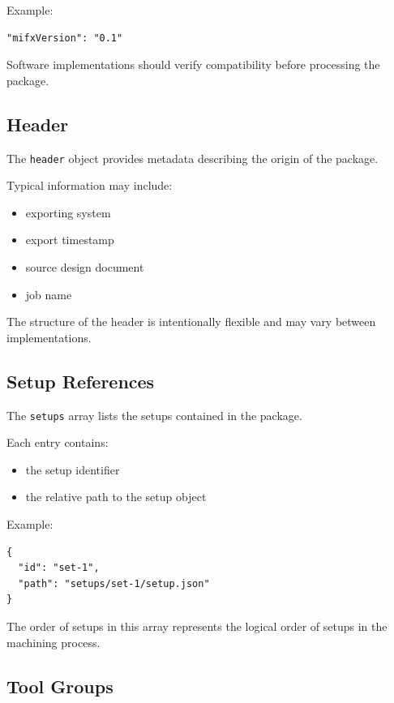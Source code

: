 Example:

\begin{verbatim}
"mifxVersion": "0.1"
\end{verbatim}

Software implementations should verify compatibility before processing the package.

\subsection{Header}

The \texttt{header} object provides metadata describing the origin of the package.

Typical information may include:

\begin{itemize}
\item exporting system
\item export timestamp
\item source design document
\item job name
\end{itemize}

The structure of the header is intentionally flexible and may vary between implementations.

\subsection{Setup References}

The \texttt{setups} array lists the setups contained in the package.

Each entry contains:

\begin{itemize}
\item the setup identifier
\item the relative path to the setup object
\end{itemize}

Example:

\begin{verbatim}
{
  "id": "set-1",
  "path": "setups/set-1/setup.json"
}
\end{verbatim}

The order of setups in this array represents the logical order of setups in the machining process.

\subsection{Tool Groups}


